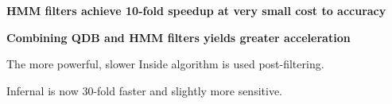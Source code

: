 \documentclass[landscape]{slides}
\begin{document}
\begin{slide}

\begin{center}
\textbf{HMM filters achieve 10-fold speedup at very small cost to accuracy}
\end{center}


\vfill

\end{slide}
\begin{slide}

\begin{center}
\normalsize
\textbf{Combining QDB and HMM filters yields greater acceleration}

\small
%
The more powerful, slower Inside algorithm is used post-filtering.

Infernal is now 30-fold faster and slightly more sensitive.
%

\end{center}


\vfill

\end{slide}
\end{document}
